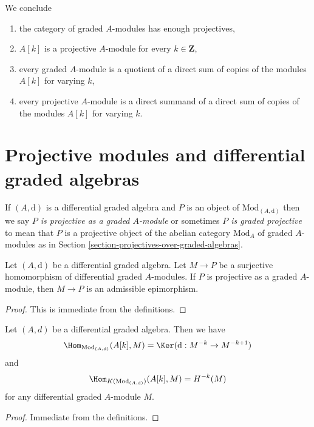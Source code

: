 \medskip\noindent
We conclude
\begin{enumerate}
\item the category of graded $A$-modules has enough projectives,
\item $A[k]$ is a projective $A$-module for every $k \in \mathbf{Z}$,
\item every graded $A$-module is a quotient of a direct sum of
copies of the modules $A[k]$ for varying $k$,
\item every projective $A$-module is a direct summand of a direct
sum of copies of the modules $A[k]$ for varying $k$.
\end{enumerate}




\section{Projective modules and differential graded algebras}
\label{section-projective-over-differential-graded}

\noindent
If $(A, \text{d})$ is a differential graded algebra and $P$ is
an object of $\text{Mod}_{(A, \text{d})}$ then we say
{\it $P$ is projective as a graded $A$-module} or sometimes
{\it $P$ is graded projective} to mean that $P$
is a projective object of the abelian category $\text{Mod}_A$
of graded $A$-modules as in
Section \ref{section-projectives-over-graded-algebras}.

\begin{lemma}
\label{lemma-target-graded-projective}
Let $(A, \text{d})$ be a differential graded algebra.
Let $M \to P$ be a surjective homomorphism of differential graded
$A$-modules. If $P$ is projective as a graded $A$-module, then
$M \to P$ is an admissible epimorphism.
\end{lemma}

\begin{proof}
This is immediate from the definitions.
\end{proof}

\begin{lemma}
\label{lemma-hom-from-shift-free}
Let $(A, d)$ be a differential graded algebra. Then we have
$$
\Hom_{\text{Mod}_{(A, \text{d})}}(A[k], M) =
\Ker(\text{d} : M^{-k} \to M^{-k + 1})
$$
and
$$
\Hom_{K(\text{Mod}_{(A, \text{d})})}(A[k], M) = H^{-k}(M)
$$
for any differential graded $A$-module $M$.
\end{lemma}

\begin{proof}
Immediate from the definitions.
\end{proof}







